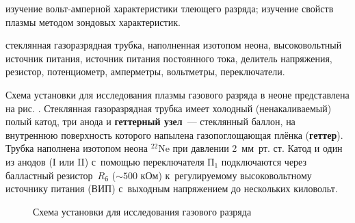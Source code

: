 




\begin{lab:aim}
	изучение вольт-амперной характеристики тлеющего разряда; изучение свойств плазмы методом зондовых характеристик.
\end{lab:aim}

\begin{lab:equipment}
	стеклянная газоразрядная трубка, наполненная изотопом неона, высоковольтный источник питания, источник питания постоянного тока, делитель напряжения, резистор, потенциометр, амперметры, вольтметры, переключатели. 
\end{lab:equipment}

Схема установки для исследования плазмы газового разряда в неоне представлена на рис. %
. Стеклянная газоразрядная трубка имеет холодный (ненакаливаемый) полый катод, три анода и \textbf{геттерный узел}~--- стеклянный баллон, на
внутреннюю поверхность которого напылена газопоглощающая плёнка (\textbf{геттер}). Трубка наполнена изотопом неона 
$^{22}$Ne при давлении 2~мм~рт. ст. Катод и один из анодов (I или II) с~помощью переключателя П$_1$ подключаются через
балластный резистор~$R_{б}$ ($\sim500$ кОм) к~регулируемому высоковольтному источнику питания (ВИП) с~выходным
напряжением до нескольких киловольт.

\begin{figure}
	\caption{Схема установки для исследования газового разряда}
\end{figure}

